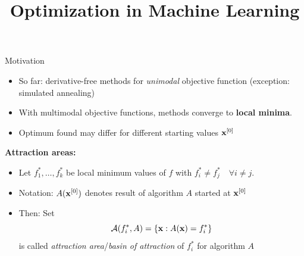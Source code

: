 \documentclass[11pt,compress,t,notes=noshow, xcolor=table]{beamer}
\title{Optimization in Machine Learning}
\begin{document}


\begin{vbframe}{Motivation}
\begin{itemize}
\item So far: derivative-free methods for \textit{unimodal} objective function (exception: simulated annealing)
\item With multimodal objective functions, methods converge to \textbf{local minima}.
\item Optimum found may differ for different starting values $\mathbf{x}^{[0]}$
\end{itemize}

\medskip

\textbf{Attraction areas:}
\begin{itemize}
    \item Let $f_1^*, \ldots, f_k^*$ be local minimum values of $f$ with $f_i^* \neq f_j^* \quad \forall i \neq j$.
    \item Notation: $A(\mathbf{x}^{[0]})$ denotes result of algorithm $A$ started at $\mathbf{x}^{[0]}$
    \item Then: Set
        \begin{equation*}
            \mathcal{A}(f_i^*, A) = \left\{ \mathbf{x} : A(\mathbf{x}) = f_i^*\right\}
        \end{equation*}
        is called \textit{attraction area}/\textit{basin of attraction} of $f_i^*$ for algorithm $A$
\end{itemize}
\end{vbframe}
\end{document}
